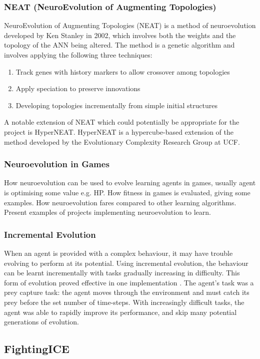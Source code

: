 \documentclass[11pt,a4paper]{article}
\begin{document}
\subsubsection{NEAT (NeuroEvolution of Augmenting Topologies)}
NeuroEvolution of Augmenting Topologies (NEAT) is a method of neuroevolution developed by Ken Stanley in 2002, which involves both the weights and the topology of the ANN being altered. The method is a genetic algorithm and involves applying the following three techniques:
\begin{enumerate}
\item Track genes with history markers to allow crossover among topologies
\item Apply speciation to preserve innovations
\item Developing topologies incrementally from simple initial structures
\end{enumerate}
A notable extension of NEAT which could potentially be appropriate for the project is HyperNEAT. HyperNEAT is a hypercube-based extension of the method developed by the Evolutionary Complexity Research Group at UCF.
\newpage
\subsubsection{Neuroevolution in Games}
How neuroevolution can be used to evolve learning agents in games, usually agent is optimising some value e.g. HP. How fitness in games is evaluated, giving some examples. How neuroevolution fares compared to other learning algorithms. Present examples of projects implementing neuroevolution to learn.
\subsubsection{Incremental Evolution}
When an agent is provided with a complex behaviour, it may have trouble evolving to perform at its potential. Using incremental evolution, the behaviour can be learnt incrementally with tasks gradually increasing in difficulty. This form of evolution proved effective in one implementation \cite{incre}. The agent's task was a prey capture task: the agent moves through the environment and must catch its prey before the set number of time-steps. With increasingly difficult tasks, the agent was able to rapidly improve its performance, and skip many potential generations of evolution.

\newpage
\subsection{FightingICE}
\end{document}
